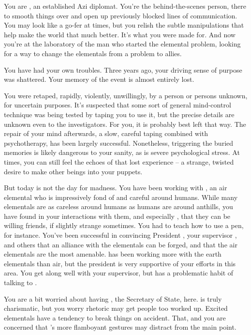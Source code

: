 \documentclass[char]{elementals}
\begin{document}
\name{\cDiplomat{}}

You are \cDiplomat{\intro}, an established Azi diplomat.  You're the behind-the-scenes person, there to smooth things over and open up previously blocked lines of communication.  You may look like a go-fer at times, but you relish the subtle manipulations that help make the world that much better.  It's what you were made for.  And now you're at the laboratory of the man who started the elemental problem, looking for a way to change the elementals from a problem to allies.

You have had your own troubles.  Three years ago, your driving sense of purpose was shattered.  Your memory of the event is almost entirely lost.

You were retaped, rapidly, violently, unwillingly, by a person or persons unknown, for uncertain purposes.  It's suspected that some sort of general mind-control technique was being tested by taping you to use it, but the precise details are unknown even to the investigators.  For you, it is probably best left that way.  The repair of your mind afterwards, a slow, careful taping combined with psychotherapy, has been largely successful.  Nonetheless, triggering the buried memories is likely dangerous to your sanity, as is severe psychological stress.  At times, you can still feel the echoes of that lost experience -- a strange, twisted desire to make other beings into your puppets.

But today is not the day for madness.  You have been working with \cNaturalist{\intro}, an air elemental who is impressively fond of and careful around humans.  While many elementals are as careless around humans as humans are around anthills, you have found in your interactions with them, and especially \cNaturalist{}, that they can be willing friends, if slightly strange sometimes.  You had to teach \cNaturalist{\them} how to use a pen, for instance.  You've been successful in convincing President \cLeader{\intro}, your supervisor \cAvatar{\intro}, and others that an alliance with the elementals can be forged, and that the air elementals are the most amenable.  \cAvatar{} has been working more with the earth elementals than air, but the president is very supportive of your efforts in this area.  You get along well with your supervisor, but \cAvatar{} has a problematic habit of talking to \cAvatar{\themself}.

You are a bit worried about having \cDema{\intro}, the Secretary of State, here.  \cDema{\They} is truly charismatic, but you worry \cDema{\their} rhetoric may get people too worked up.  Excited elementals have a tendency to break things on accident.  That, and you are concerned that \cDema{}'s more flamboyant gestures may distract from the main point.
\end{document}

